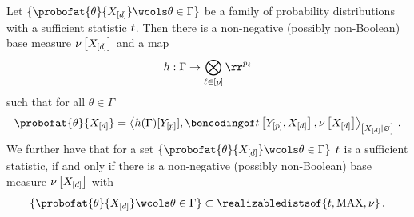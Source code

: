 \documentclass[aps,onecolumn,nofootinbib,pra]{article}
\begin{document}
    \begin{theorem}
        Let $\{\probofat{\theta}{\shortcatvariables}\wcols\theta\in\Gamma\}$ be a family of probability distributions with a sufficient statistic $t$.
        Then there is a non-negative (possibly non-Boolean) base measure $\nu\left[X_{[d]}\right]$ and a map
        \begin{align*}
            h : \Gamma \rightarrow \bigotimes_{\selindexin} \rr^{\seldimof{\selindex}}
        \end{align*}
        such that for all $\theta\in\Gamma$
        \begin{align*}
            \probofat{\theta}{\shortcatvariables}
            = \normalizationof{h(\Gamma)[\headvariables],\bencsstatwith,\basemeasurewith}{\shortcatvariables} \, .
        \end{align*}
        We further have that for a set $\{\probofat{\theta}{\shortcatvariables}\wcols\theta\in\Gamma\}$ $t$ is a sufficient statistic, if and only if there is a non-negative (possibly non-Boolean) base measure $\nu\left[X_{[d]}\right]$ with
        \begin{align*}
            \{\probofat{\theta}{\shortcatvariables}\wcols\theta\in\Gamma\}
            \subset \realizabledistsof{\sstat,\maxgraph,\basemeasure} \, .
        \end{align*}
    \end{theorem}
\end{document}
